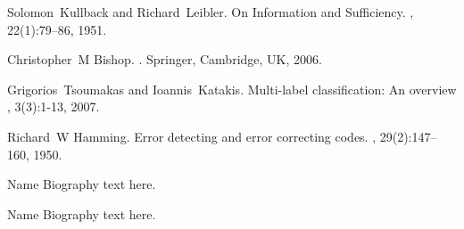 \documentclass[13pt,journal,compsoc,onecolumn]{IEEEtran}
\begin{document}
\begin{thebibliography}{10}
Solomon~Kullback and Richard~Leibler.
\newblock On Information and Sufficiency.
, 22(1):79–86, 1951.

Christopher~M Bishop.
.
\newblock Springer, Cambridge, UK, 2006.

Grigorios~Tsoumakas and Ioannis~Katakis.
\newblock Multi-label classification: An overview
, 3(3):1-13, 2007.

Richard~W Hamming.
\newblock Error detecting and error correcting codes.
, 29(2):147–160, 1950.


\end{thebibliography}

% 

\begin{IEEEbiography}{Name}
Biography text here.
\end{IEEEbiography}

\begin{IEEEbiographynophoto}{Name}
Biography text here.
\end{IEEEbiographynophoto}







\end{document}

